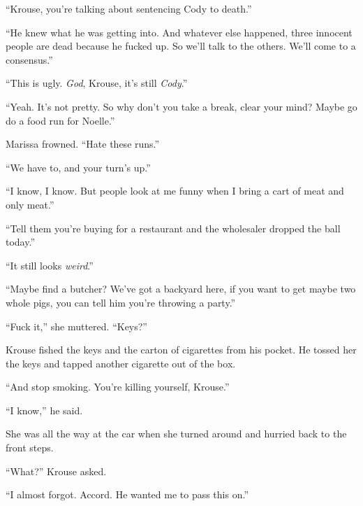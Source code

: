 ``Krouse, you're talking about sentencing Cody to death.''



``He knew what he was getting into.  And whatever else happened, three innocent people are dead because he fucked up.  So we'll talk to the others.  We'll come to a consensus.''



``This is ugly.  \emph{God}, Krouse, it's still \emph{Cody}.''



``Yeah.  It's not pretty.  So why don't you take a break, clear your mind?  Maybe go do a food run for Noelle.''



Marissa frowned.  ``Hate these runs.''



``We have to, and your turn's up.''



``I know, I know.  But people look at me funny when I bring a cart of meat and only meat.''



``Tell them you're buying for a restaurant and the wholesaler dropped the ball today.''



``It still looks \emph{weird}.''



``Maybe find a butcher?  We've got a backyard here, if you want to get maybe two whole pigs, you can tell him you're throwing a party.''



``Fuck it,'' she muttered.  ``Keys?''



Krouse fished the keys and the carton of cigarettes from his pocket.  He tossed her the keys and tapped another cigarette out of the box.



``And stop smoking.  You're killing yourself, Krouse.''



``I know,'' he said.



She was all the way at the car when she turned around and hurried back to the front steps.



``What?''  Krouse asked.



``I almost forgot.  Accord.  He wanted me to pass this on.''



